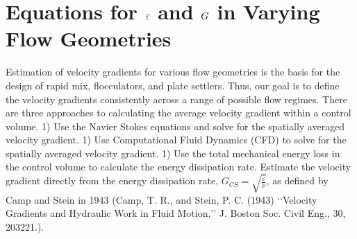 \documentclass[letterpaper,10pt,english]{sphinxmanual}
\begin{document}
\section{Equations for \protect\(\varepsilon\protect\) and \protect\(G\protect\) in Varying Flow Geometries}
\label{\detokenize{Rapid_Mix/RM_Derivations:equations-for-and-in-varying-flow-geometries}}\label{\detokenize{Rapid_Mix/RM_Derivations:heading-equations-varying-flow-geometries}}
Estimation of velocity gradients for various flow geometries is the basis for the design of rapid mix, flocculators, and plate settlers. Thus, our goal is to define the velocity gradients consistently across a range of possible flow regimes. There are three approaches to calculating the average velocity gradient within a control volume. 1) Use the Navier Stokes equations and solve for the spatially averaged velocity gradient. 1) Use Computational Fluid Dynamics (CFD) to solve for the spatially averaged velocity gradient. 1) Use the total mechanical energy loss in the control volume to calculate the energy dissipation rate. Estimate the velocity gradient directly from the energy dissipation rate, \(G_{CS} = \sqrt{\frac{\bar\varepsilon}{\nu}}\), as defined by Camp and Stein in 1943 (Camp, T. R., and Stein, P. C. (1943) ‘‘Velocity Gradients and Hydraulic Work in Fluid Motion,’’ J. Boston Soc. Civil Eng., 30, 203\textendash{}221.).
\end{document}
